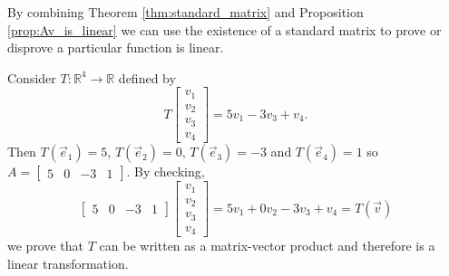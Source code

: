 By combining Theorem \ref{thm:standard_matrix} and 
Proposition \ref{prop:Av_is_linear} we can use the existence of a standard 
matrix to prove or disprove a particular function is linear. 
\begin{example}
Consider $T:\mathbb{R}^4 \to \mathbb{R}$ defined by
\[
T\begin{bmatrix}v_1 \\ v_2 \\ v_3 \\ v_4 \end{bmatrix}=5v_1-3v_3+v_4.
\]
Then $T(\vec{e}_1)=5$, $T(\vec{e}_2)=0$, $T(\vec{e}_3)=-3$ and $T(\vec{e}_4)=1$ 
so $A=\begin{bmatrix}5 & 0 & -3 & 1\end{bmatrix}$.
By checking, 
\[
\begin{bmatrix}5 & 0 & -3 & 1\end{bmatrix}
\begin{bmatrix}v_1 \\ v_2 \\ v_3 \\ v_4 \end{bmatrix}
=5v_1+0v_2-3v_3+v_4=T(\vec{v})
\]
we prove that $T$ can be written as a matrix-vector product and therefore is 
a linear transformation.
\end{example}

